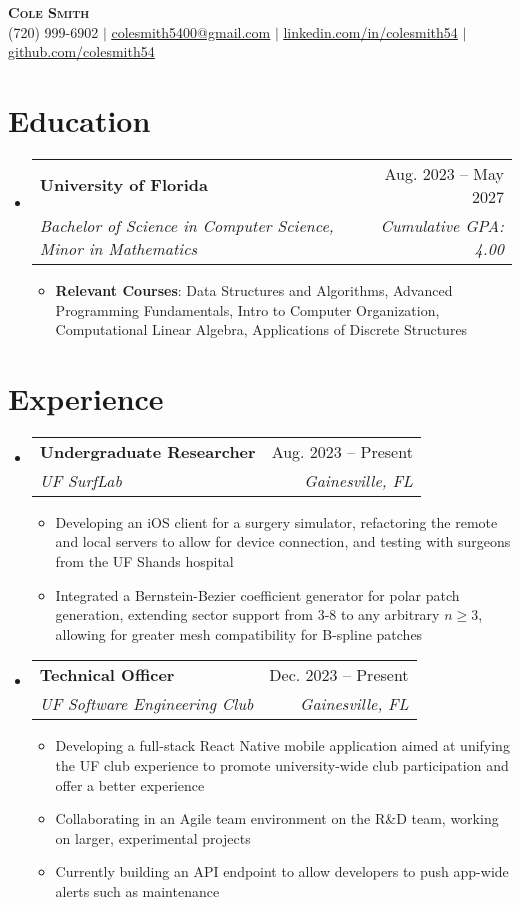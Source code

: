 \documentclass[letterpaper,12pt]{article}
\makeatletter
\newcommand{\resumeItem}[1]{
  \item\small{
    {#1 \vspace{-2pt}}
  }
}
\newcommand{\resumeSubheading}[4]{
  \vspace{-2pt}\item
    \begin{tabular*}{0.97\textwidth}[t]{l@{\extracolsep{\fill}}r}
      \textbf{#1} & #2 \\
      \textit{\small#3} & \textit{\small #4} \\
    \end{tabular*}\vspace{-7pt}
}
\newcommand{\resumeSubHeadingListStart}{\begin{itemize}[leftmargin=0.15in, label={}]}
\newcommand{\resumeSubHeadingListEnd}{\end{itemize}}
\newcommand{\resumeItemListStart}{\begin{itemize}}
\newcommand{\resumeItemListEnd}{\end{itemize}\vspace{-5pt}}
\makeatother
\begin{document}
\begin{center}
    \textbf{\Huge \scshape Cole Smith} \\ \vspace{1pt}
    \small (720) 999-6902 $|$ \href{mailto:colesmith5400@gmail.com}{\underline{colesmith5400@gmail.com}} $|$ 
    \href{https://linkedin.com/in/colesmith54}{\underline{linkedin.com/in/colesmith54}} $|$
    \href{https://github.com/colesmith54}{\underline{github.com/colesmith54}}
\end{center}


\section{Education}
  \resumeSubHeadingListStart
    \resumeSubheading
      {University of Florida}{Aug. 2023 -- May 2027}
      {Bachelor of Science in Computer Science, Minor in Mathematics}{Cumulative GPA: 4.00}
      \resumeItemListStart
        \resumeItem{\textbf{Relevant Courses}: Data Structures and Algorithms, Advanced Programming Fundamentals, Intro to Computer Organization, Computational Linear Algebra, Applications of Discrete Structures}
      \resumeItemListEnd
  \resumeSubHeadingListEnd


\section{Experience}
  \resumeSubHeadingListStart
    \resumeSubheading
      {Undergraduate Researcher}{Aug. 2023 -- Present}
      {UF SurfLab}{Gainesville, FL}
      \resumeItemListStart
        \resumeItem{Developing an iOS client for a surgery simulator, refactoring the remote and local servers to allow for device connection, and testing with surgeons from the UF Shands hospital}
        \resumeItem{Integrated a Bernstein-Bezier coefficient generator for polar patch generation, extending sector support from 3-8 to any arbitrary $n \geq 3$, allowing for greater mesh compatibility for B-spline patches }
      \resumeItemListEnd
    \resumeSubheading
      {Technical Officer}{Dec. 2023 -- Present}
      {UF Software Engineering Club}{Gainesville, FL}
      \resumeItemListStart
        \resumeItem{Developing a full-stack React Native mobile application aimed at unifying the UF club experience to promote university-wide club participation and offer a better experience}
        \resumeItem{Collaborating in an Agile team environment on the R\&D team, working on larger, experimental projects}
        \resumeItem{Currently building an API endpoint to allow developers to push app-wide alerts such as maintenance}
      \resumeItemListEnd
  \resumeSubHeadingListEnd
\end{document}
